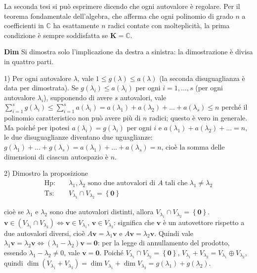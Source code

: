 \documentclass{article}
\begin{document}
La seconda tesi si pu\`{o} esprimere dicendo che ogni autovalore \`{e}
regolare. Per il teorema fondamentale dell'algebra, che afferma che ogni
polinomio di grado $n$ a coefficienti in $%
\mathbb{C}
$ ha esattamente $n$ radici contate con molteplicit\`{a}, la prima
condizione \`{e} sempre soddisfatta se $\mathbf{K}=%
\mathbb{C}
$.

\textbf{Dim} Si dimostra solo l'implicazione da destra a sinistra: la
dimostrazione \`{e} divisa in quattro parti.

1) Per ogni autovalore $\lambda $, vale $1\leq g\left( \lambda \right) \leq
a\left( \lambda \right) $ (la seconda disuguaglianza \`{e} data per
dimostrata). Se $g\left( \lambda _{i}\right) \leq a\left( \lambda
_{i}\right) $ per ogni $i=1,...,s$ (per ogni autovalore $\lambda _{i}$),
supponendo di avere $s$ autovalori, vale $\sum_{i=1}^{s}g\left( \lambda
_{i}\right) \leq \sum_{i=1}^{s}a\left( \lambda _{i}\right) =a\left( \lambda
_{1}\right) +a\left( \lambda _{2}\right) +...+a\left( \lambda _{s}\right)
\leq n$ perch\'{e} il polinomio caratteristico non pu\`{o} avere pi\`{u} di $%
n$ radici; questo \`{e} vero in generale. Ma poich\'{e} per ipotesi $a\left(
\lambda _{i}\right) =g\left( \lambda _{i}\right) $ per ogni $i$ e $a\left(
\lambda _{1}\right) +a\left( \lambda _{2}\right) +...=n$, le due
disuguaglianze diventano due uguaglianze: $g\left( \lambda _{1}\right)
+...+g\left( \lambda _{s}\right) =a\left( \lambda _{1}\right) +...+a\left(
\lambda _{s}\right) =n$, cio\`{e} la somma delle dimensioni di ciascun
autospazio \`{e} $n$.

2) Dimostro la proposizione%
\begin{eqnarray*}
\text{Hp}\text{: } &&\lambda _{1},\lambda _{2}\text{ sono due autovalori di }%
A\text{ tali che }\lambda _{1}\neq \lambda _{2} \\
\text{Ts}\text{: } &&V_{\lambda _{1}}\cap V_{\lambda _{2}}=\left\{ \mathbf{0}%
\right\}
\end{eqnarray*}

cio\`{e} se $\lambda _{1}$ e $\lambda _{2}$ sono due autovalori distinti,
allora $V_{\lambda _{1}}\cap V_{\lambda _{2}}=\left\{ \mathbf{0}\right\} $. $%
\mathbf{v}\in \left( V_{\lambda _{1}}\cap V_{\lambda _{2}}\right)
\Longleftrightarrow \mathbf{v}\in V_{\lambda _{1}}$, $\mathbf{v}\in
V_{\lambda _{2}}$: significa che $\mathbf{v}$ \`{e} un autovettore rispetto
a due autovalori diversi, cio\`{e} $A\mathbf{v}=\lambda _{1}\mathbf{v}$ e $A%
\mathbf{v}=\lambda _{2}\mathbf{v}$. Quindi vale $\lambda _{1}\mathbf{v}%
=\lambda _{2}\mathbf{v}\Longleftrightarrow \left( \lambda _{1}-\lambda
_{2}\right) \mathbf{v=0}$: per la legge di annullamento del prodotto,
essendo $\lambda _{1}-\lambda _{2}\neq 0$, vale $\mathbf{v=0}$. Poich\'{e} $%
V_{\lambda _{1}}\cap V_{\lambda _{2}}=\left\{ \mathbf{0}\right\} $, $%
V_{\lambda _{1}}+V_{\lambda _{2}}=V_{\lambda _{1}}\oplus V_{\lambda _{2}}$,
quindi $\dim \left( V_{\lambda _{1}}+V_{\lambda _{2}}\right) =\dim
V_{\lambda _{1}}+\dim V_{\lambda _{2}}=g\left( \lambda _{1}\right) +g\left(
\lambda _{2}\right) $.
\end{document}

